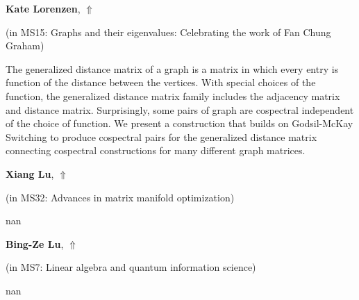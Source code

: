 \documentclass[ILAS2025-program.tex]{subfiles}
\begin{document}
     \hypertarget{down0028}{}\begin{ilasabstract}
    
    \textbf{Kate Lorenzen},  \hfill \hyperlink{up0028}{$\Uparrow$}
    
    (in {\color{mstitle}MS15: Graphs and their eigenvalues: Celebrating the work of Fan Chung Graham})
        
        \mtskip
    The generalized distance matrix of a graph is a matrix in which every entry is function of the distance between the vertices. With special choices of the function, the generalized distance matrix family includes the adjacency matrix and distance matrix. Surprisingly, some pairs of graph are cospectral independent of the choice of function.  We present a construction that builds on Godsil-McKay Switching to produce cospectral pairs for the generalized distance matrix connecting cospectral constructions for many different graph matrices.
\end{ilasabstract}
     \hypertarget{down0188}{}\begin{ilasabstract}
    
    \textbf{Xiang Lu},  \hfill \hyperlink{up0188}{$\Uparrow$}
    
    (in {\color{mstitle}MS32: Advances in matrix manifold optimization})
        
        \mtskip
    nan\end{ilasabstract}
     \hypertarget{down0206}{}\begin{ilasabstract}
    
    \textbf{Bing-Ze Lu},  \hfill \hyperlink{up0206}{$\Uparrow$}
    
    (in {\color{mstitle}MS7: Linear algebra and quantum information science})
        
        \mtskip
    nan\end{ilasabstract}
\end{document}
